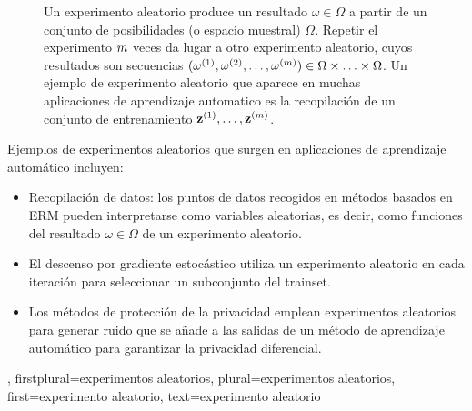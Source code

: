 {{\begin{figure}[H]
\begin{center}
		  \end{center}
		  \caption{Un experimento aleatorio produce un resultado $\omega \in \Omega$ a partir de un conjunto de posibilidades (o espacio muestral) 
		  $\Omega$. Repetir el experimento $m$ veces da lugar a otro experimento aleatorio, cuyos resultados son 
		  secuencias $(\omega^{(1)}, \omega^{(2)}, \dots, \omega^{(m)}) \in \Omega\times\ldots\times \Omega$. 
		  Un ejemplo de experimento aleatorio que aparece en muchas aplicaciones de aprendizaje automatico es la recopilación 
		  de un conjunto de entrenamiento ${\bf z}^{(1)},\ldots,{\bf z}^{(m)}$.}
	  \end{figure} 
	  Ejemplos de experimentos aleatorios que surgen en aplicaciones de aprendizaje automático incluyen: 
	  \begin{itemize} 
		 \item Recopilación de datos: los puntos de datos recogidos en métodos basados en ERM 
		 pueden interpretarse como variables aleatorias, es decir, como funciones del resultado $\omega \in \Omega$ 
		 de un experimento aleatorio. 
		 \item El descenso por gradiente estocástico utiliza un experimento aleatorio en cada iteración para seleccionar un subconjunto del 
		 \gls{trainset}. 
		 \item Los métodos de protección de la privacidad emplean experimentos aleatorios para generar ruido que se añade a las 
		 salidas de un método de aprendizaje automático para garantizar la privacidad diferencial. 
	  \end{itemize} },
  firstplural={experimentos aleatorios},
  plural={experimentos aleatorios},
  first={experimento aleatorio},
  text={experimento aleatorio}
 }
 



